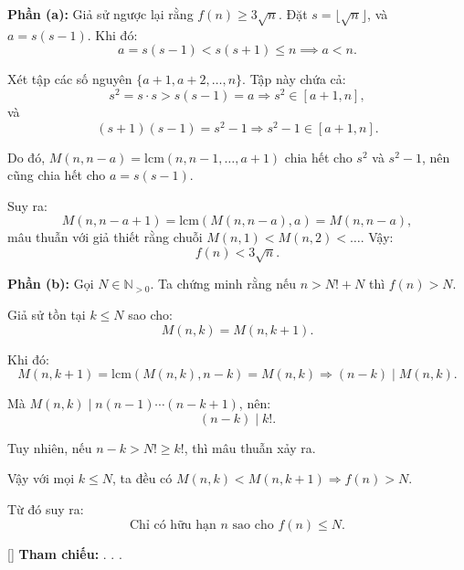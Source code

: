 \documentclass[../03-arithmetic-functions.tex]{subfiles}
\begin{document}
\begin{soln}

    \textbf{Phần (a):} Giả sử ngược lại rằng \( f(n) \ge 3\sqrt{n} \). Đặt \( s = \lfloor \sqrt{n} \rfloor \), và \( a = s(s - 1) \). Khi đó:
    \[
        a = s(s - 1) < s(s + 1) \le n \implies a < n.
    \]

    Xét tập các số nguyên \( \{a+1, a+2, \dots, n\} \). Tập này chứa cả:
    \[
        s^2 = s \cdot s > s(s - 1) = a \Rightarrow s^2 \in [a+1, n],
    \]
    và
    \[
        (s + 1)(s - 1) = s^2 - 1 \Rightarrow s^2 - 1 \in [a+1, n].
    \]

    Do đó, \( M(n, n - a) = \mathrm{lcm}(n, n-1, \dots, a+1) \) chia hết cho \( s^2 \) và \( s^2 - 1 \), nên cũng chia hết cho \( a = s(s - 1) \).  

    Suy ra:
    \[
        M(n, n - a + 1) = \mathrm{lcm}(M(n, n - a), a) = M(n, n - a),
    \]
    mâu thuẫn với giả thiết rằng chuỗi \( M(n,1) < M(n,2) < \dots \). Vậy:
    \[
        \boxed{f(n) < 3\sqrt{n}}.
    \]

    \medskip

    \textbf{Phần (b):} Gọi \( N \in \mathbb{N}_{>0} \). Ta chứng minh rằng nếu \( n > N! + N \) thì \( f(n) > N \).

    Giả sử tồn tại \( k \le N \) sao cho:
    \[
        M(n, k) = M(n, k + 1).
    \]
    
    Khi đó:
    \[
        M(n, k + 1) = \mathrm{lcm}(M(n, k), n - k) = M(n, k)
        \Rightarrow (n - k) \mid M(n, k).
    \]

    Mà \( M(n, k) \mid n(n-1)\cdots(n - k + 1) \), nên:
    \[
        (n - k) \mid k!.
    \]

    Tuy nhiên, nếu \( n - k > N! \ge k! \), thì mâu thuẫn xảy ra.

    Vậy với mọi \( k \le N \), ta đều có \( M(n, k) < M(n, k + 1) \Rightarrow f(n) > N \).  

    Từ đó suy ra:
    \[
        \boxed{\text{Chỉ có hữu hạn } n \text{ sao cho } f(n) \le N.}
    \]

    \vspace{1em}
    [\textbf{}]  
    \textbf{Tham chiếu:} . . .
\end{soln}

\end{document}
